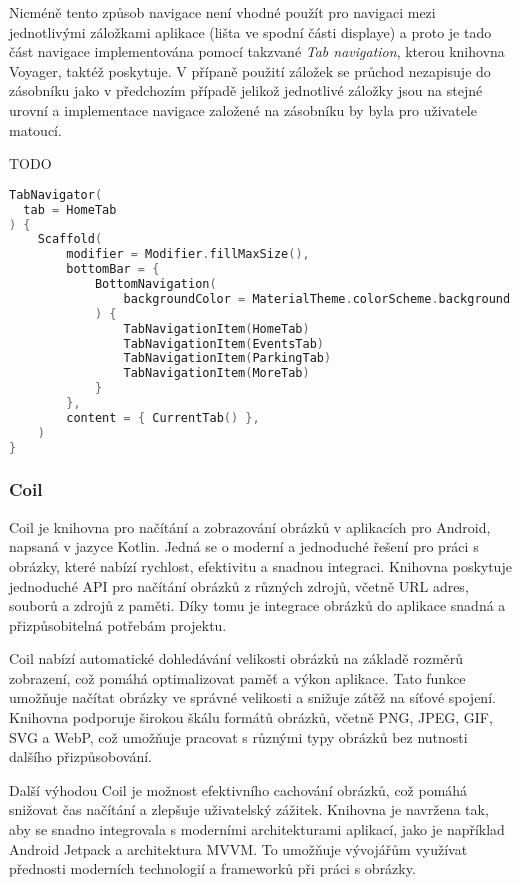  Nicméně tento způsob navigace není vhodné použít pro navigaci mezi jednotlivými záložkami aplikace (lišta ve spodní části displaye) 
 a proto je tado část navigace 
 implementována pomocí takzvané \textit{Tab navigation}, kterou knihovna Voyager, taktéž poskytuje. V přípaně použití záložek se
 průchod nezapisuje do zásobníku jako v předchozím případě jelikož jednotlivé záložky jsou na stejné urovní a implementace navigace
 založené na zásobníku by byla pro uživatele matoucí.

 TODO
 \begin{lstlisting}[caption={Ukázka použití navigace založené na záložkách}, label={lst:tabNav}, language=Kotlin]
TabNavigator(
  tab = HomeTab
) {
    Scaffold(
        modifier = Modifier.fillMaxSize(),
        bottomBar = {
            BottomNavigation(
                backgroundColor = MaterialTheme.colorScheme.background
            ) {
                TabNavigationItem(HomeTab)
                TabNavigationItem(EventsTab)
                TabNavigationItem(ParkingTab)
                TabNavigationItem(MoreTab)
            }
        },
        content = { CurrentTab() },
    )
}
\end{lstlisting}


\subsubsection*{Coil}
Coil je knihovna pro načítání a zobrazování obrázků v aplikacích pro Android, napsaná v jazyce Kotlin. Jedná se o moderní a jednoduché 
řešení pro práci s obrázky, které nabízí rychlost, efektivitu a snadnou integraci. Knihovna poskytuje jednoduché API pro načítání obrázků 
z různých zdrojů, včetně URL adres, souborů a zdrojů z paměti. Díky tomu je integrace obrázků do aplikace snadná a přizpůsobitelná potřebám projektu.

Coil nabízí automatické dohledávání velikosti obrázků na základě rozměrů zobrazení, což pomáhá optimalizovat paměť a výkon aplikace. Tato funkce 
umožňuje načítat obrázky ve správné velikosti a snižuje zátěž na síťové spojení. Knihovna podporuje širokou škálu formátů obrázků, včetně PNG, 
JPEG, GIF, SVG a WebP, což umožňuje pracovat s různými typy obrázků bez nutnosti dalšího přizpůsobování.

Další výhodou Coil je možnost efektivního cachování obrázků, což pomáhá snižovat čas načítání a zlepšuje uživatelský zážitek. Knihovna je navržena tak, 
aby se snadno integrovala s moderními architekturami aplikací, jako je například Android Jetpack a architektura MVVM. To umožňuje vývojářům využívat 
přednosti moderních technologií a frameworků při práci s obrázky.

